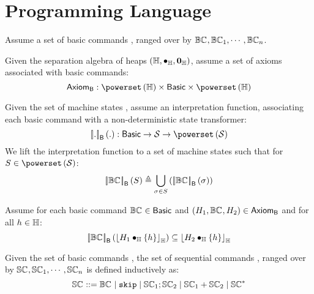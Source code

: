 \section*{Programming Language}
\begin{parameter}
Assume a set of basic commands \Basics, ranged over by $\mathbb{BC}_{}, \mathbb{BC}_{1}, \cdots, \mathbb{BC}_{n}$.
\end{parameter}
%
%
\begin{parameter}
Given the separation algebra of heaps $\left(\mathbb{H}, \bullet_{\mathbb{H}}, \mathbf{0}_{\mathbb{H}} \right)$, assume a set of axioms associated with basic commands:
%
\[
	\AxiomsB : \pset{\Heaps} \times \Basics \times \pset{\Heaps}
\]
%
\end{parameter}
%
%
\begin{parameter}\label{par:basicSoundness}
Given the set of machine states \MStates, assume an interpretation function, associating each basic command with a non-deterministic state transformer:
%
\[
	\opSemB{.}{.} : \Basics \rightarrow \MStates \rightarrow \pset{\MStates}
\]
%
We lift the interpretation function to a set of machine states such that for $S \in \pset{\MStates}$:
%
\[
	\left[\!\left| \mathbb{BC}_{} \right |\! \right]_{\textsf{B}}\left( S \right) \triangleq \bigcup\limits_{\sigma_{} \in S} \left( \left[\!\left| \mathbb{BC}_{} \right |\! \right]_{\textsf{B}}\left( \sigma_{} \right)\right)
\]
%
\end{parameter}
%
%
\begin{parameter}
Assume for each basic command $\mathbb{BC}_{} \in \textsf{Basic}$ and $\left(H_1, \mathbb{BC}_{}, H_2\right) \in \textsf{Axiom}_{\textsf{B}}$ and for all $h \in \mathbb{H}$:
%
\[
	\left[\!\left| \mathbb{BC}_{} \right |\! \right]_{\textsf{B}}\left( \left\lfloor H_1 \bullet_{\mathbb{H}} \{h\} \right\rfloor_{\mathbb{H}} \right) \subseteq  \left\lfloor H_2 \bullet_{\mathbb{H}} \{h\} \right\rfloor_{\mathbb{H}}
\]
%
\end{parameter}
%
%
\begin{definition}
Given the set of basic commands \Basics, the set of sequential commands \Seqs, ranged over by $\mathbb{SC}_{}, \mathbb{SC}_{1}, \cdots, \mathbb{SC}_{n}$ is defined inductively as:
%
\[
	\mathbb{SC}_{} ::= \mathbb{BC}_{} \;|\; \texttt{skip} \;|\; \mathbb{SC}_{1} ; \mathbb{SC}_{2} \;|\; \mathbb{SC}_{1} + \mathbb{SC}_{2} \;|\; \mathbb{SC}_{}^{*}
\]
%
\end{definition}
%
%
